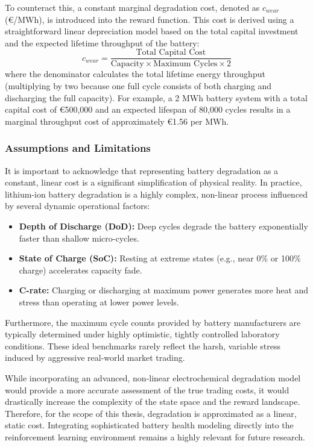 To counteract this, a constant marginal degradation cost, denoted as $c_{wear}$ (€/MWh), is introduced into the reward function. This cost is derived using a straightforward linear depreciation model based on the total capital investment and the expected lifetime throughput of the battery:
\[
    c_{wear} = \frac{\text{Total Capital Cost}}{\text{Capacity} \times \text{Maximum Cycles} \times 2}
\]
where the denominator calculates the total lifetime energy throughput (multiplying by two because one full cycle consists of both charging and discharging the full capacity). For example, a 2 MWh battery system with a total capital cost of €500,000 and an expected lifespan of 80,000 cycles results in a marginal throughput cost of approximately €1.56 per MWh.

\subsubsection*{Assumptions and Limitations}
It is important to acknowledge that representing battery degradation as a constant, linear cost is a significant simplification of physical reality. In practice, lithium-ion battery degradation is a highly complex, non-linear process influenced by several dynamic operational factors:
\begin{itemize}
    TODO Confirm this with literature
    https://www.scribd.com/document/906050666/Zhou-2011

    \item \textbf{Depth of Discharge (DoD):} Deep cycles degrade the battery exponentially faster than shallow micro-cycles.
    \item \textbf{State of Charge (SoC):} Resting at extreme states (e.g., near 0\% or 100\% charge) accelerates capacity fade.
    \item \textbf{C-rate:} Charging or discharging at maximum power generates more heat and stress than operating at lower power levels.
\end{itemize}

Furthermore, the maximum cycle counts provided by battery manufacturers are typically determined under highly optimistic, tightly controlled laboratory conditions. These ideal benchmarks rarely reflect the harsh, variable stress induced by aggressive real-world market trading. 

While incorporating an advanced, non-linear electrochemical degradation model would provide a more accurate assessment of the true trading costs, it would drastically increase the complexity of the state space and the reward landscape. Therefore, for the scope of this thesis, degradation is approximated as a linear, static cost. Integrating sophisticated battery health modeling directly into the reinforcement learning environment remains a highly relevant for future research.

